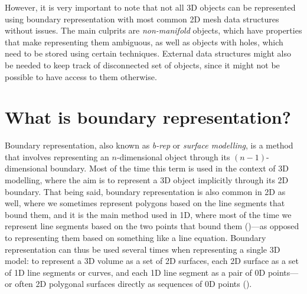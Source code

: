 However, it is very important to note that not all 3D objects can be represented using boundary representation with most common 2D mesh data structures without issues.
The main culprits are \emph{non-manifold} objects, which have properties that make representing them ambiguous, as well as objects with holes, which need to be stored using certain techniques.
External data structures might also be needed to keep track of disconnected set of objects, since it might not be possible to have access to them otherwise.

\section{What is boundary representation?}

Boundary representation, also known as \emph{b-rep} or \emph{surface modelling}, is a method that involves representing an \(n\)-dimensional object through its \((n-1)\)-dimensional boundary.
Most of the time this term is used in the context of 3D modelling, where the aim is to represent a 3D object implicitly through its 2D boundary.
That being said, boundary representation is also common in 2D as well, where we sometimes represent polygons based on the line segments that bound them, and it is the main method used in 1D, where most of the time we represent line segments based on the two points that bound them ()---as opposed to representing them based on something like a line equation.
Boundary representation can thus be used several times when representing a single 3D model: to represent a 3D volume as a set of 2D surfaces, each 2D surface as a set of 1D line segments or curves, and each 1D line segment as a pair of 0D points---or often 2D polygonal surfaces directly as sequences of 0D points ().

